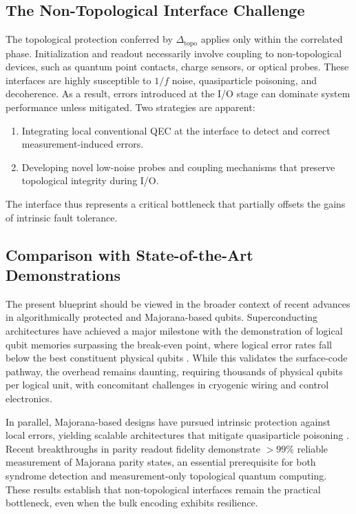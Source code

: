 \documentclass[aps,prl,twocolumn,superscriptaddress]{revtex4-2}
\begin{document}
\subsection{The Non-Topological Interface Challenge}
The topological protection conferred by $\Delta_{\text{topo}}$ applies only within the correlated phase. Initialization and readout necessarily involve coupling to non-topological devices, such as quantum point contacts, charge sensors, or optical probes. These interfaces are highly susceptible to $1/f$ noise, quasiparticle poisoning, and decoherence. As a result, errors introduced at the I/O stage can dominate system performance unless mitigated. Two strategies are apparent:  
\begin{enumerate}
    \item Integrating local conventional QEC at the interface to detect and correct measurement-induced errors.  
    \item Developing novel low-noise probes and coupling mechanisms that preserve topological integrity during I/O.  
\end{enumerate}
The interface thus represents a critical bottleneck that partially offsets the gains of intrinsic fault tolerance.

\subsection{Comparison with State-of-the-Art Demonstrations}
The present blueprint should be viewed in the broader context of recent advances in algorithmically protected and Majorana-based qubits. 
Superconducting architectures have achieved a major milestone with the demonstration of logical qubit memories surpassing the break-even point, where logical error rates fall below the best constituent physical qubits \cite{Willow2025}. 
While this validates the surface-code pathway, the overhead remains daunting, requiring thousands of physical qubits per logical unit, with concomitant challenges in cryogenic wiring and control electronics.

In parallel, Majorana-based designs have pursued intrinsic protection against local errors, yielding scalable architectures that mitigate quasiparticle poisoning \cite{Karzig2017}. 
Recent breakthroughs in parity readout fidelity \cite{Higginbotham2024,Frolov2025} demonstrate $>99\%$ reliable measurement of Majorana parity states, an essential prerequisite for both syndrome detection and measurement-only topological quantum computing. 
These results establish that non-topological interfaces remain the practical bottleneck, even when the bulk encoding exhibits resilience.
\end{document}

